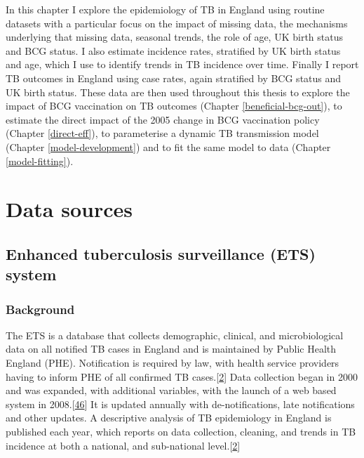 \documentclass[11pt,twoside]{bristolthesis}
\begin{document}
  In this chapter I explore the epidemiology of TB in England using routine datasets with a particular focus on the impact of missing data, the mechanisms underlying that missing data, seasonal trends, the role of age, UK birth status and BCG status. I also estimate incidence rates, stratified by UK birth status and age, which I use to identify trends in TB incidence over time. Finally I report TB outcomes in England using case rates, again stratified by BCG status and UK birth status. These data are then used throughout this thesis to explore the impact of BCG vaccination on TB outcomes (Chapter \ref{beneficial-bcg-out}), to estimate the direct impact of the 2005 change in BCG vaccination policy (Chapter \ref{direct-eff}), to parameterise a dynamic TB transmission model (Chapter \ref{model-development}) and to fit the same model to data (Chapter \ref{model-fitting}).
  
  \hypertarget{data-sources}{%
  \section{Data sources}\label{data-sources}}
  
  \hypertarget{ets-deep-dive}{%
  \subsection{Enhanced tuberculosis surveillance (ETS) system}\label{ets-deep-dive}}
  
  \hypertarget{background-1}{%
  \subsubsection{Background}\label{background-1}}
  
  The ETS is a database that collects demographic, clinical, and microbiological data on all notified TB cases in England and is maintained by Public Health England (PHE). Notification is required by law, with health service providers having to inform PHE of all confirmed TB cases.{[}\protect\hyperlink{ref-PHE2017}{2}{]} Data collection began in 2000 and was expanded, with additional variables, with the launch of a web based system in 2008.{[}\protect\hyperlink{ref-Kriujshaar2007}{46}{]} It is updated annually with de-notifications, late notifications and other updates. A descriptive analysis of TB epidemiology in England is published each year, which reports on data collection, cleaning, and trends in TB incidence at both a national, and sub-national level.{[}\protect\hyperlink{ref-PHE2017}{2}{]}
  
\end{document}
